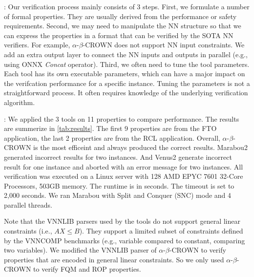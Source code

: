 : Our verification process mainly consists of 3 steps. First, we formulate a number of formal properties. They are usually derived from the performance or safety requirements. Second, we may need to manipulate the NN structure so that we can express the properties in a format that can be verified by the SOTA NN verifiers. For example, $\alpha$-$\beta$-CROWN does not support NN input constraints. We add an extra output layer to connect the NN inputs and outputs in parallel (e.g., using ONNX \emph{Concat} operator). Third, we often need to tune the tool parameters. Each tool has its own executable parameters, which can have a major impact on the verifcation performance for a specific instance. Tuning the parameters is not a straightforward process. It often requires knowledge of the underlying verification algorithm. 


: We applied the 3 tools on 11 properties to compare performance. The results are summerize in \ref{tab:results}. The first 9 properties are from the FTO application, the last 2 properties are from the RCL application. Overall, $\alpha$-$\beta$-CROWN is the most efficeint and always produced the correct results. Marabou2 generated incorrect results for two instances. And Venus2 generate incorrect result for one instance and aborted with an error message for two instances. All verification was executed on a Linux server with 128 AMD EPYC 7601 32-Core Processors, 503GB memory. The runtime is in seconds. The timeout is set to 2,000 seconds. We ran Marabou with Split and Conquer (SNC) mode and 4 parallel threads.

Note that the VNNLIB parsers used by the tools do not support general linear constraints (i.e., $AX\le B$). They support a limited subset of constraints defined by the VNNCOMP benchmarks (e.g., variable compared to constant, comparing two variables). We modified the VNNLIB parser of $\alpha$-$\beta$-CROWN to verify properties that are encoded in general linear constraints. So we only used $\alpha$-$\beta$-CROWN to verify FQM and ROP properties.


